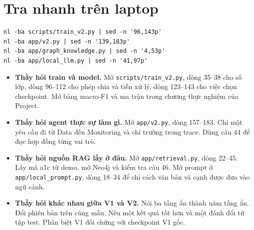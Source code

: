 \section{Tra nhanh trên laptop}

\begin{Verbatim}[fontsize=\small]
nl -ba scripts/train_v2.py | sed -n '96,143p'
nl -ba app/v2.py | sed -n '139,183p'
nl -ba app/graph_knowledge.py | sed -n '4,53p'
nl -ba app/local_llm.py | sed -n '41,97p'
\end{Verbatim}

\begin{itemize}
\item \textbf{Thầy hỏi train và model.} Mở \nolinkurl{scripts/train_v2.py}, dòng 35--38 cho số lớp, dòng 96--112 cho phép chia và tiền xử lý, dòng 123--143 cho việc chọn checkpoint. Mở bảng macro-F1 và ma trận trong chương thực nghiệm của Project.
\item \textbf{Thầy hỏi agent thực sự làm gì.} Mở \nolinkurl{app/v2.py}, dòng 157--183. Chỉ một yêu cầu đi từ Data đến Monitoring và chỉ trường  trong trace. Dùng câu 44 để đọc hợp đồng từng vai trò.
\item \textbf{Thầy hỏi nguồn RAG lấy ở đâu.} Mở \nolinkurl{app/retrieval.py}, dòng 22--45. Lấy mã a1c từ demo, mở Neo4j và kiểm tra câu 46. Mở prompt ở \nolinkurl{app/local_prompt.py}, dòng 18--34 để chỉ cách văn bản và cạnh được đưa vào ngữ cảnh.
\item \textbf{Thầy hỏi khác nhau giữa V1 và V2.} Nói ba tầng ẩn thành năm tầng ẩn. Đổi phiên bản trên cùng mẫu. Nêu một kết quả tốt hơn và một đánh đổi từ tập test. Phân biệt V1 đối chứng với checkpoint V1 gốc.
\end{itemize}
